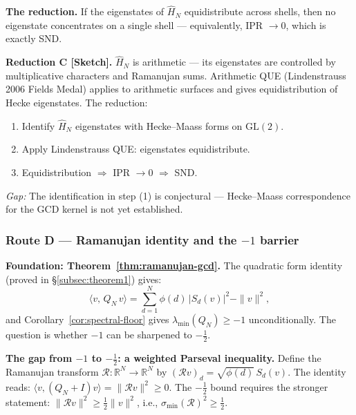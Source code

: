 \documentclass[12pt]{article}
\newcommand{\half}{\tfrac{1}{2}}
\begin{document}
\textbf{The reduction.}
If the eigenstates of $\hat{H}_N$ equidistribute across shells, then
no eigenstate concentrates on a single shell --- equivalently, IPR $\to 0$,
which is exactly SND.
\begin{tcolorbox}[keybox]
\textbf{Reduction C [Sketch].}
$\hat{H}_N$ is arithmetic --- its eigenstates are controlled by
multiplicative characters and Ramanujan sums.
Arithmetic QUE (Lindenstrauss 2006 Fields Medal) applies to
arithmetic surfaces and gives equidistribution of Hecke eigenstates.
The reduction:
\begin{enumerate}[itemsep=1pt]
  \item Identify $\hat{H}_N$ eigenstates with Hecke--Maass forms on $\mathrm{GL}(2)$.
  \item Apply Lindenstrauss QUE: eigenstates equidistribute.
  \item Equidistribution $\Rightarrow$ IPR $\to 0$ $\Rightarrow$ SND.
\end{enumerate}
\textit{Gap:} The identification in step (1) is conjectural ---
Hecke--Maass correspondence for the GCD kernel is not yet established.
\end{tcolorbox}

\subsubsection*{Route D \;---\; Ramanujan identity and the $-1$ barrier}

\textbf{Foundation: Theorem~\ref{thm:ramanujan-gcd}.}
The quadratic form identity (proved in \S\ref{subsec:theorem1}) gives:
\[
  \langle v,\, Q_N\, v\rangle
  = \sum_{d=1}^N \phi(d)\,|S_d(v)|^2 - \|v\|^2,
\]
and Corollary~\ref{cor:spectral-floor} gives $\lambda_{\min}(Q_N) \ge -1$
unconditionally.
The question is whether $-1$ can be sharpened to $-\tfrac{1}{2}$.

\textbf{The gap from $-1$ to $-\half$: a weighted Parseval inequality.}
Define the Ramanujan transform $\mathcal{R}: \mathbb{R}^N \to \mathbb{R}^N$ by
$(\mathcal{R}v)_d = \sqrt{\phi(d)}\, S_d(v)$.
The identity reads:
$\langle v, (Q_N + I)v\rangle = \|\mathcal{R}v\|^2 \ge 0$.
The $-\half$ bound requires the stronger statement:
$\|\mathcal{R}v\|^2 \ge \frac{1}{2}\|v\|^2$,
i.e., $\sigma_{\min}(\mathcal{R})^2 \ge \frac{1}{2}$.
\end{document}
